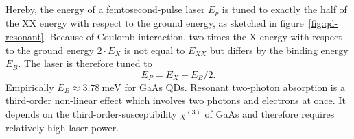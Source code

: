 Hereby, the energy of a femtosecond-pulse laser $E_p$ is tuned to exactly the half of the \ac{XX} energy with respect to the ground energy, as sketched in figure~\ref{fig:qd-resonant}.
Because of Coulomb interaction, two times the \ac{X} energy with respect to the ground energy $2 \cdot E_X$ is not equal to $E_{XX}$ but differs by the binding energy $E_B$.
The laser is therefore tuned to
\begin{equation}
E_P = E_X - E_B / 2.
\end{equation}
Empirically $E_B \approx \SI{3.78}{\milli \electronvolt}$ for GaAs \acp{QD}.
Resonant two-photon absorption is a third-order non-linear effect which involves two photons and electrons at once.
It depends on the third-order-susceptibility $\chi^{(3)}$ of GaAs and therefore requires relatively high laser power.

